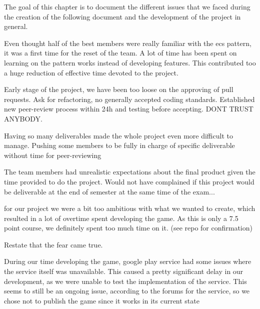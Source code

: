 The goal of this chapter is to document the different issues that we faced during the creation of the following document and the development of the project in general.

Even thought half of the best members were really familiar with the \gls{ecs} pattern, it was a first time for the reset of the team. A lot of time has been spent on learning on the pattern works instead of developing features. This contributed too a huge reduction of effective time devoted to the project.


Early stage of the project, we have been too loose on the approving of pull requests. Ask for refactoring, no generally accepted coding standards. Established new peer-review process within 24h and testing before accepting. DONT TRUST ANYBODY.

Having so many deliverables made the whole project even more difficult to manage. Pushing some members to be fully in charge of specific deliverable without time for peer-reviewing

The team members had unrealistic expectations about the final product given the time provided to do the project. Would not have complained if this project would be deliverable at the end of semester at the same time of the exam...

for our project we were a bit too ambitious with what we wanted to create, which resulted in a lot of overtime spent developing the game. As this is only a 7.5 point course, we definitely spent too much time on it. (see repo for confirmation)


Restate that the fear came true.

During our time developing the game, google play service had some issues where the service itself was unavailable. This caused a pretty significant delay in our development, as we were unable to test the implementation of the service. This seems to still be an ongoing issue, according to the forums for the service, so we chose not to publish the game since it works in its current state
